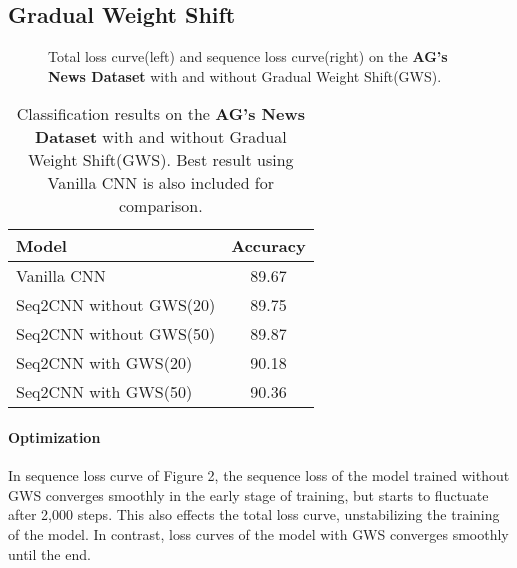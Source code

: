 \documentclass{article}
\begin{document}
\subsection{Gradual Weight Shift}
\begin{figure}
  \centering
{}
  \caption{Total loss curve(left) and sequence loss curve(right) on the \textbf{AG's News Dataset} with and without Gradual Weight Shift(GWS). }
\end{figure}
\begin{table}[ht]
  \caption{Classification results on the \textbf{AG's News Dataset} with and without Gradual Weight Shift(GWS). Best result using Vanilla CNN is also included for comparison.}
  \label{table3}
  \centering
  \begin{tabular}{lc}
    \toprule
    Model & Accuracy\\
    \midrule
    Vanilla CNN  &89.67 \\
    Seq2CNN without GWS(20)  &89.75  \\
    Seq2CNN without GWS(50)  &89.87	  \\
    Seq2CNN with GWS(20)  &90.18 \\
    Seq2CNN with GWS(50)  &90.36  \\
    \bottomrule
  \end{tabular}
\end{table}

\paragraph{Optimization}In sequence loss curve of Figure 2, the sequence loss of the model trained without GWS converges smoothly in the early stage of training, but starts to fluctuate after 2,000 steps. This also effects the total loss curve, unstabilizing the training of the model. In contrast, loss curves of the model with GWS converges smoothly until the end. 
\end{document}
